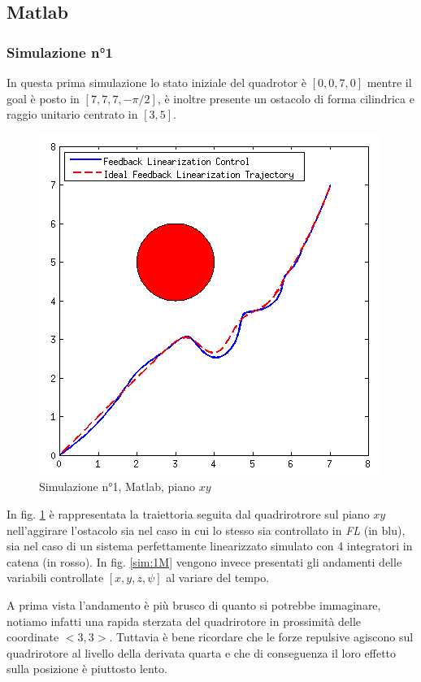 \documentclass[a4paper,10pt]{article}
\begin{document}
\subsection{Matlab}
\subsubsection*{Simulazione n°1}
In questa prima simulazione lo stato iniziale del quadrotor è $[0,0,7,0]$ mentre il goal è posto in $[7,7,7,-\pi/2]$, è inoltre presente un ostacolo di forma cilindrica e raggio unitario centrato in $[3,5]$.
\begin{figure}
\begin{center}
\includegraphics[scale=0.6]{img/plot/matlab/sim1_xy.png}
\end{center}
\caption{Simulazione n°1, Matlab, piano $xy$}
\label{sim:1xy_M}
\end{figure}

In fig. \ref{sim:1xy_M} è rappresentata la traiettoria seguita dal quadrirotrore sul piano $xy$ nell'aggirare l'ostacolo sia nel caso in cui lo stesso sia controllato in \emph{FL} (in blu), sia nel caso di un sistema perfettamente linearizzato simulato con 4 integratori in catena (in rosso). In fig. \ref{sim:1M} vengono invece presentati gli andamenti delle variabili controllate $[ x , y , z , \psi ]$ al variare del tempo.

A prima vista l'andamento è più brusco di quanto si potrebbe immaginare, notiamo infatti una rapida sterzata del quadrirotore in prossimità delle coordinate $<3,3>$. Tuttavia è bene ricordare che le forze repulsive agiscono sul quadrirotore al livello della derivata quarta e che di conseguenza il loro effetto sulla posizione è piuttosto lento. 
\end{document}
